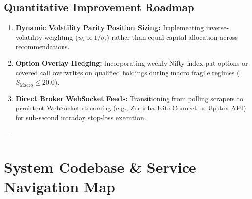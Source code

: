 \documentclass[11pt,a4paper]{article}
\begin{document}
\subsection{Quantitative Improvement Roadmap}
\begin{enumerate}[leftmargin=*]
    \item \textbf{Dynamic Volatility Parity Position Sizing:} Implementing inverse-volatility weighting ($w_i \propto 1 / \sigma_i$) rather than equal capital allocation across recommendations.
    \item \textbf{Option Overlay Hedging:} Incorporating weekly Nifty index put options or covered call overwrites on qualified holdings during macro fragile regimes ($S_{\text{Macro}} \le 20.0$).
    \item \textbf{Direct Broker WebSocket Feeds:} Transitioning from polling scrapers to persistent WebSocket streaming (e.g., Zerodha Kite Connect or Upstox API) for sub-second intraday stop-loss execution.
\end{enumerate}

---

\section{System Codebase \& Service Navigation Map}
\end{document}
